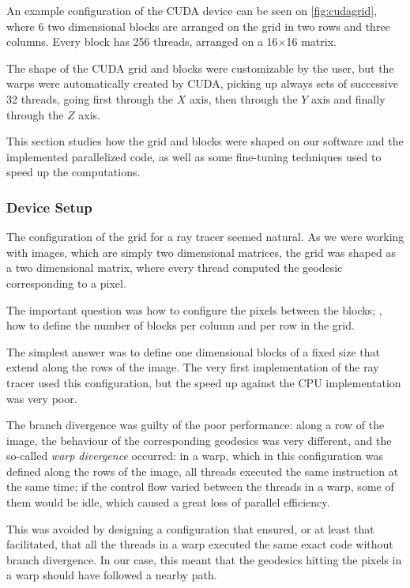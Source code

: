 An example configuration of the \ac{CUDA} device can be seen on \autoref{fig:cudagrid}, where 6 two dimensional blocks are arranged on the grid in two rows and three columns. Every block has 256 threads, arranged on a 16$\times$16 matrix.

The shape of the \ac{CUDA} grid and blocks were customizable by the user, but the warps were automatically created by \ac{CUDA}, picking up always sets of successive 32 threads, going first through the $X$ axis, then through the $Y$ axis and finally through the $Z$ axis.

This section studies how the grid and blocks were shaped on our software and the implemented parallelized code, as well as some fine-tuning techniques used to speed up the computations.

\subsubsection*{Device Setup}

The configuration of the grid for a ray tracer seemed natural. As we were working with images, which are simply two dimensional matrices, the grid was shaped as a two dimensional matrix, where every thread computed the geodesic corresponding to a pixel.

The important question was how to configure the pixels between the blocks; \ie, how to define the number of blocks per column and per row in the grid.

The simplest answer was to define one dimensional blocks of a fixed size that extend along the rows of the image. The very first implementation of the ray tracer used this configuration, but the speed up against the \ac{CPU} implementation was very poor.

The branch divergence was guilty of the poor performance: along a row of the image, the behaviour of the corresponding geodesics was very different, and the so-called \emph{warp divergence} occurred: in a warp, which in this configuration was defined along the rows of the image, all threads executed the same instruction at the same time; if the control flow varied between the threads in a warp, some of them would be idle, which caused a great loss of parallel efficiency.

This was avoided by designing a configuration that ensured, or at least that facilitated, that all the threads in a warp executed the same exact code without branch divergence. In our case, this meant that the geodesics hitting the pixels in a warp should have followed a nearby path.

